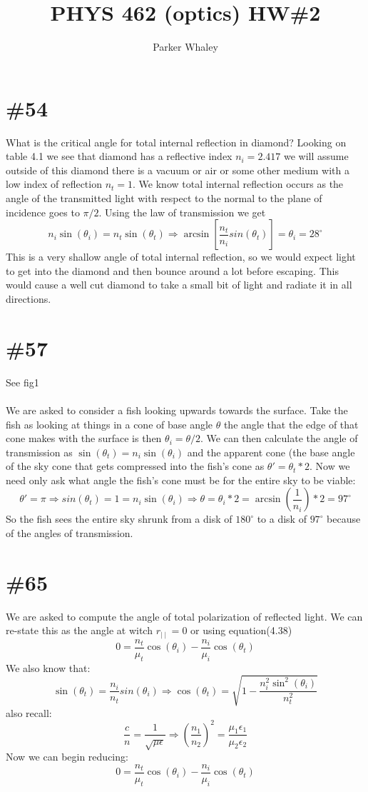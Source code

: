 \documentclass[10pt,a4paper]{article}
\author{Parker Whaley}
\title{PHYS 462 (optics) HW\#2}
\begin{document}
\maketitle

\section{\#54}
What is the critical angle for total internal reflection in diamond?  Looking on table 4.1 we see that diamond has a reflective index $n_i=2.417$ we will assume outside of this diamond there is a vacuum or air or some other medium with a low index of reflection $n_t=1$.  We know total internal reflection occurs as the angle of the transmitted light with respect to the normal to the plane of incidence goes to $\pi/2$.  Using the law of transmission we get\[n_i \sin(\theta_i)=n_t \sin(\theta_t)\Rightarrow \arcsin[\frac{n_t}{n_i} sin(\theta_t)]=\theta_i=28^\circ\]This is a very shallow angle of total internal reflection, so we would expect light to get into the diamond and then bounce around a lot before escaping.  This would cause a well cut diamond to take a small bit of light and radiate it in all directions.

\section{\#57}
See fig1\\\\
We are asked to consider a fish looking upwards towards the surface.  Take the fish as looking at things in a cone of base angle $\theta$ the angle that the edge of that cone makes with the surface is then $\theta_i=\theta/2$.  We can then calculate the angle of transmission as $\sin(\theta_t)=n_i \sin(\theta_i)$ and the apparent cone (the base angle of the sky cone that gets compressed into the fish's cone as $\theta'=\theta_t*2$.  Now we need only ask what angle the fish's cone must be for the entire sky to be viable: \[\theta'=\pi\Rightarrow sin(\theta_t)=1=n_i\sin(\theta_i)\Rightarrow \theta=\theta_i*2=\arcsin(\frac{1}{n_i})*2=97^\circ\]
So the fish sees the entire sky shrunk from a disk of $180^\circ$ to a disk of $97^\circ$ because of the angles of transmission.

\section{\#65}
We are asked to compute the angle of total polarization of reflected light.  We can re-state this as the angle at witch $r_{\mid\mid}=0$ or using equation(4.38)
\[0=\frac{n_t}{\mu_t}\cos(\theta_i)-\frac{n_i}{\mu_i}\cos(\theta_t)\]
We also know that:
\[\sin(\theta_t)=\frac{n_i}{n_t}sin(\theta_i)\Rightarrow \cos(\theta_t)=\sqrt{1-\frac{n_i^2\sin^2(\theta_i)}{n_t^2}}\]
also recall:
\[\frac{c}{n}=\frac{1}{\sqrt{\mu\epsilon}}\Rightarrow (\frac{n_1}{n_2})^2=\frac{\mu_1\epsilon_1}{\mu_2\epsilon_2}\]
Now we can begin reducing:
\[0=\frac{n_t}{\mu_t}\cos(\theta_i)-\frac{n_i}{\mu_i}\cos(\theta_t)\]
\end{document}
